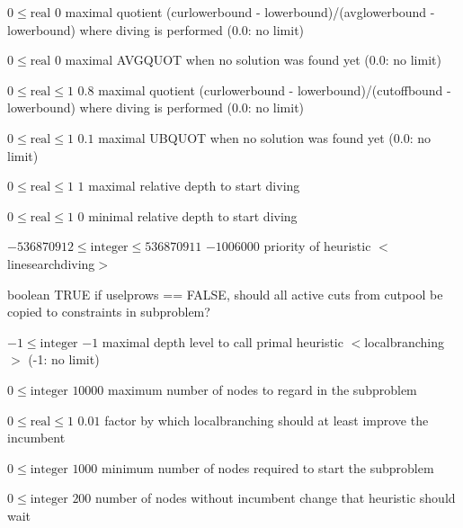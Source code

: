 %
{$0\leq\textrm{real}$}%
{$0$}%
{maximal quotient (curlowerbound - lowerbound)/(avglowerbound - lowerbound) where diving is performed (0.0: no limit)}%
{}

%
{$0\leq\textrm{real}$}%
{$0$}%
{maximal AVGQUOT when no solution was found yet (0.0: no limit)}%
{}

%
{$0\leq\textrm{real}\leq1$}%
{$0.8$}%
{maximal quotient (curlowerbound - lowerbound)/(cutoffbound - lowerbound) where diving is performed (0.0: no limit)}%
{}

%
{$0\leq\textrm{real}\leq1$}%
{$0.1$}%
{maximal UBQUOT when no solution was found yet (0.0: no limit)}%
{}

%
{$0\leq\textrm{real}\leq1$}%
{$1$}%
{maximal relative depth to start diving}%
{}

%
{$0\leq\textrm{real}\leq1$}%
{$0$}%
{minimal relative depth to start diving}%
{}

%
{$-536870912\leq\textrm{integer}\leq536870911$}%
{$-1006000$}%
{priority of heuristic $<$linesearchdiving$>$}%
{}

%
{boolean}%
{TRUE}%
{if uselprows == FALSE, should all active cuts from cutpool be copied to constraints in subproblem?}%
{}

%
{$-1\leq\textrm{integer}$}%
{$-1$}%
{maximal depth level to call primal heuristic $<$localbranching$>$ (-1: no limit)}%
{}

%
{$0\leq\textrm{integer}$}%
{$10000$}%
{maximum number of nodes to regard in the subproblem}%
{}

%
{$0\leq\textrm{real}\leq1$}%
{$0.01$}%
{factor by which localbranching should at least improve the incumbent}%
{}

%
{$0\leq\textrm{integer}$}%
{$1000$}%
{minimum number of nodes required to start the subproblem}%
{}

%
{$0\leq\textrm{integer}$}%
{$200$}%
{number of nodes without incumbent change that heuristic should wait}%
{}

